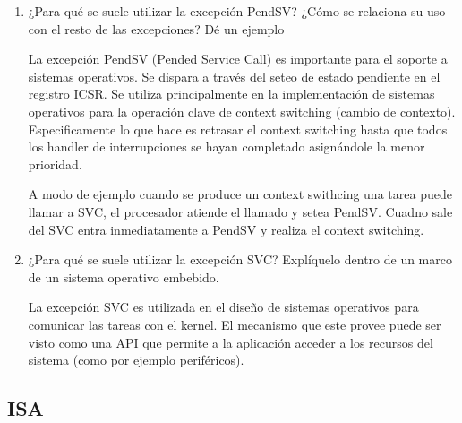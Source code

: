\documentclass[12pt, a4paper]{article}
\makeatletter
\newcommand\setItemnumber[1]{\setcounter{enum\romannumeral\@enumdepth}{\numexpr#1-1\relax}}
\makeatother
\begin{document}
\begin{enumerate}
    
    \setItemnumber{20}
    \item ¿Para qué se suele utilizar la excepción PendSV? ¿Cómo se relaciona su uso con el resto 
    de las excepciones? Dé un ejemplo
    
    La excepción PendSV (Pended Service Call) es importante para el soporte a sistemas operativos.
    Se dispara a través del seteo de estado pendiente en el registro ICSR. Se utiliza principalmente 
    en la implementación de sistemas operativos para la operación clave de context switching 
    (cambio de contexto). Especificamente lo que hace es retrasar el context switching hasta que 
    todos los handler de interrupciones se hayan completado asignándole la menor prioridad.
    
    A modo de ejemplo cuando se produce un context swithcing una tarea puede llamar a SVC, el procesador 
    atiende el llamado y setea PendSV. Cuadno sale del SVC entra inmediatamente a PendSV y realiza el 
    context switching.
    
    \setItemnumber{21}
    \item¿Para qué se suele utilizar la excepción SVC? Explíquelo dentro de un marco de un 
    sistema operativo embebido.
    
    La excepción SVC es  utilizada en el diseño de sistemas operativos para comunicar 
    las tareas con el kernel. El mecanismo que este provee puede ser visto como una API
    que permite a la aplicación acceder a los recursos del sistema (como por ejemplo periféricos).
    
\end{enumerate}

\subsection{ISA}
\end{document}
